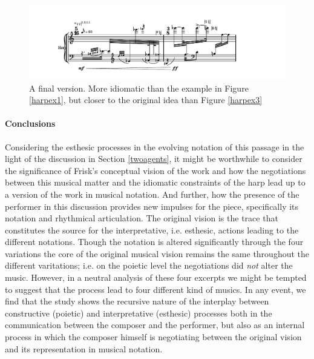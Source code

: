 \documentclass[10pt,letterpaper]{article}
\begin{document}
\begin{figure}[!htb]
\includegraphics[width=1.0\columnwidth]{img/harpVersion4}
\caption{A final version. More idiomatic than the example in Figure
\ref{harpex1}, but closer to the original idea than Figure
\ref{harpex3}} \label{harpex4}
\end{figure}

\paragraph{Conclusions}
Considering the esthesic processes in the evolving notation of this
passage in the light of the discussion in Section \ref{twoagents}, it
might be worthwhile to consider the significance of Frisk's conceptual
vision of the work and how the negotiations between this musical matter
and the idiomatic constraints of the harp lead up to a version of the
work in musical notation. And further, how the presence of the performer
in this discussion provides new impulses for the piece, specifically its
notation and rhythmical articulation. The original vision is the trace
that constitutes the source for the interpretative, i.e. esthesic,
actions leading to the different notations. Though the notation is
altered significantly through the four variations the core of the
original musical vision remains the same throughout the different
varitations; i.e. on the poietic level the negotiations did {\itshape
not} alter the music. However, in a neutral analysis of these four
excerpts we might be tempted to suggest that the process lead to four
different kind of musics. In any event, we find that the study shows the
recursive nature of the interplay between constructive (poietic) and
interpretative (esthesic) processes both in the communication between
the composer and the performer, but also as an internal process in which
the composer himself is negotiating between the original vision and its
representation in musical notation.
\end{document}
